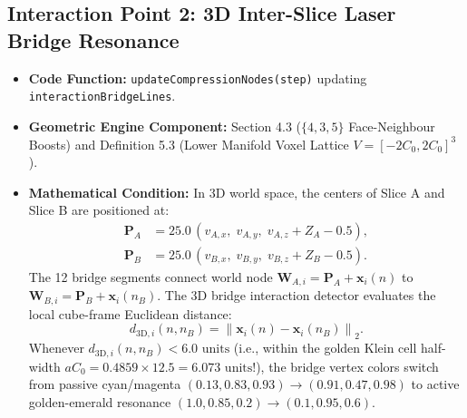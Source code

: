 \documentclass[11pt, a4paper]{article}
\begin{document}
\subsection{Interaction Point 2: 3D Inter-Slice Laser Bridge Resonance}
\begin{itemize}
    \item \textbf{Code Function:} \texttt{updateCompressionNodes(step)} updating \texttt{interactionBridgeLines}.
    \item \textbf{Geometric Engine Component:} Section 4.3 ($\{4,3,5\}$ Face-Neighbour Boosts) and Definition 5.3 (Lower Manifold Voxel Lattice $V = [-2C_0, 2C_0]^3$).
    \item \textbf{Mathematical Condition:}
    In 3D world space, the centers of Slice A and Slice B are positioned at:
    \begin{align}
    \mathbf{P}_A &= 25.0\,\left(v_{A,x},\; v_{A,y},\; v_{A,z} + Z_A - 0.5\right), \\
    \mathbf{P}_B &= 25.0\,\left(v_{B,x},\; v_{B,y},\; v_{B,z} + Z_B - 0.5\right).
    \end{align}
    The 12 bridge segments connect world node $\mathbf{W}_{A,i} = \mathbf{P}_A + \mathbf{x}_i(n)$ to $\mathbf{W}_{B,i} = \mathbf{P}_B + \mathbf{x}_i(n_B)$. The 3D bridge interaction detector evaluates the local cube-frame Euclidean distance:
    \begin{equation}
    d_{\text{3D},i}(n, n_B) = \left\|\mathbf{x}_i(n) - \mathbf{x}_i(n_B)\right\|_2.
    \end{equation}
    Whenever $d_{\text{3D},i}(n, n_B) < 6.0\text{ units}$ (i.e., within the golden Klein cell half-width $a C_0 = 0.4859 \times 12.5 = 6.073\text{ units}$!), the bridge vertex colors switch from passive cyan/magenta $(0.13, 0.83, 0.93) \to (0.91, 0.47, 0.98)$ to active golden-emerald resonance $(1.0, 0.85, 0.2) \to (0.1, 0.95, 0.6)$.
\end{itemize}
\end{document}
